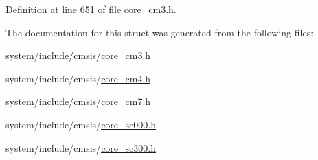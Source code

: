 Definition at line 651 of file core\+\_\+cm3.\+h.



The documentation for this struct was generated from the following files\+:\begin{DoxyCompactItemize}
\item 
system/include/cmsis/\hyperlink{core__cm3_8h}{core\+\_\+cm3.\+h}\item 
system/include/cmsis/\hyperlink{core__cm4_8h}{core\+\_\+cm4.\+h}\item 
system/include/cmsis/\hyperlink{core__cm7_8h}{core\+\_\+cm7.\+h}\item 
system/include/cmsis/\hyperlink{core__sc000_8h}{core\+\_\+sc000.\+h}\item 
system/include/cmsis/\hyperlink{core__sc300_8h}{core\+\_\+sc300.\+h}\end{DoxyCompactItemize}
